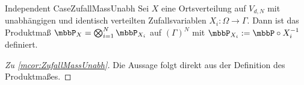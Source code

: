 \begin{mcor}{Independent Case}{ZufallMassUnabh}
    Sei $X$ eine Ortsverteilung auf $V_{d,N}$ mit unabhängigen und identisch verteilten Zufallsvariablen $X_i:\Omega\to\Gamma$. Dann ist das Produktmaß $\mbbP_X = \bigotimes_{i=1}^N\mbbP_{X_i}$ auf $(\Gamma)^N$ mit $\mbbP_{X_i} := \mbbP\circ X_i^{-1}$ definiert.
\end{mcor}
\begin{proof}[Zu \ref{mcor:ZufallMassUnabh}]
    Die Aussage folgt direkt aus der Definition des Produktmaßes.
    
\end{proof}